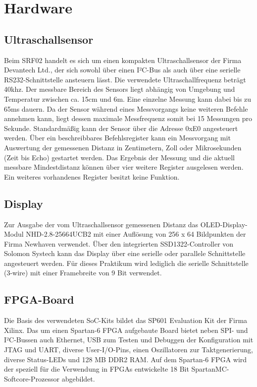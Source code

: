 \documentclass[parskip,
							 oneside,
							 11pt,
							 noheadingspace,
							 accentcolor=tud1d,
							 bigchapter,
							 colorback]{tudreport}
\begin{document}
\chapter{Hardware}

\section{Ultraschallsensor}
Beim SRF02 handelt es sich um einen kompakten Ultraschallsensor der Firma Devantech Ltd., der sich sowohl über einen I²C-Bus als auch über eine serielle RS232-Schnittstelle ansteuern lässt. Die verwendete Ultraschallfrequenz beträgt 40khz.
Der messbare Bereich des Sensors liegt abhängig von Umgebung und Temperatur zwischen ca. 15cm und 6m. Eine einzelne Messung kann dabei bis zu 65ms dauern. Da der Sensor während eines Messvorgangs keine weiteren Befehle annehmen kann, liegt dessen maximale Messfrequenz somit bei 15 Messungen pro Sekunde.
Standardmäßig kann der Sensor über die Adresse 0xE0 angesteuert werden. Über ein beschreibbares Befehlsregister kann ein Messvorgang mit Auswertung der gemessenen Distanz in Zentimetern, Zoll oder Mikrosekunden (Zeit bis Echo) gestartet werden. Das Ergebnis der Messung und die aktuell messbare Mindestdistanz können über vier weitere Register ausgelesen werden. Ein weiteres vorhandenes Register besitzt keine Funktion.

\section{Display}
Zur Ausgabe der vom Ultraschallsensor gemessenen Distanz das OLED-Display-Modul NHD-2.8-25664UCB2 mit einer Auflösung von 256 x 64 Bildpunkten der Firma Newhaven verwendet. Über den integrierten SSD1322-Controller von Solomon Systech kann das Display über eine serielle oder parallele Schnittstelle angesteuert werden.  
Für dieses Praktikum wird lediglich die serielle Schnittstelle (3-wire) mit einer Framebreite von 9 Bit verwendet.

	\section{FPGA-Board}
Die Basis des verwendeten SoC-Kits bildet das SP601 Evaluation Kit der Firma Xilinx. Das um einen Spartan-6 FPGA aufgebaute Board bietet neben SPI- und I²C-Bussen auch Ethernet, USB zum Testen und Debuggen der Konfiguration mit JTAG und UART, diverse User-I/O-Pins, einen Oszillatoren zur Taktgenerierung, diverse Status-LEDs und 128 MB DDR2 RAM.
Auf dem Spartan-6 FPGA wird der speziell für die Verwendung in FPGAs entwickelte 18 Bit SpartanMC-Softcore-Prozessor abgebildet. 
\end{document}
